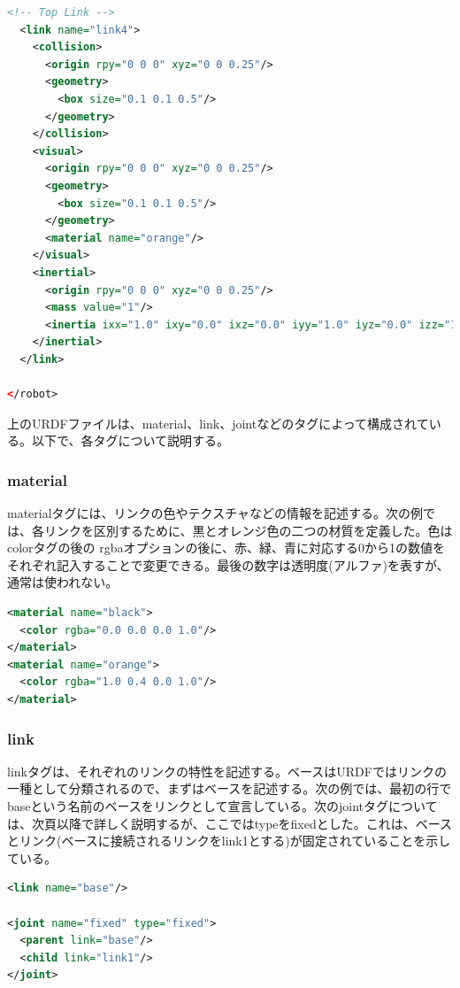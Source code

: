 \begin{lstlisting}[language=XML]
  <!-- Top Link -->
  <link name="link4">
    <collision>
      <origin rpy="0 0 0" xyz="0 0 0.25"/>
      <geometry>
        <box size="0.1 0.1 0.5"/>
      </geometry>
    </collision>
    <visual>
      <origin rpy="0 0 0" xyz="0 0 0.25"/>
      <geometry>
        <box size="0.1 0.1 0.5"/>
      </geometry>
      <material name="orange"/>
    </visual>
    <inertial>
      <origin rpy="0 0 0" xyz="0 0 0.25"/>
      <mass value="1"/>
      <inertia ixx="1.0" ixy="0.0" ixz="0.0" iyy="1.0" iyz="0.0" izz="1.0"/>
    </inertial>
  </link>

</robot>
\end{lstlisting}

上のURDFファイルは、material、link、jointなどのタグによって構成されている。以下で、各タグについて説明する。

\subsubsection{material}

materialタグには、リンクの色やテクスチャなどの情報を記述する。次の例では、各リンクを区別するために、黒とオレンジ色の二つの材質を定義した。色はcolorタグの後の rgbaオプションの後に、赤、緑、青に対応する0から1の数値をそれぞれ記入することで変更できる。最後の数字は透明度(アルファ)を表すが、通常は使われない。

\begin{lstlisting}[language=XML]
<material name="black">
  <color rgba="0.0 0.0 0.0 1.0"/>
</material>
<material name="orange">
  <color rgba="1.0 0.4 0.0 1.0"/>
</material>
\end{lstlisting}

\subsubsection{link}

linkタグは、それぞれのリンクの特性を記述する。ベースはURDFではリンクの一種として分類されるので、まずはベースを記述する。次の例では、最初の行でbaseという名前のベースをリンクとして宣言している。次のjointタグについては、次頁以降で詳しく説明するが、ここではtypeをfixedとした。これは、ベースとリンク(ベースに接続されるリンクをlink1とする)が固定されていることを示している。

\begin{lstlisting}[language=XML]
<link name="base"/>

<joint name="fixed" type="fixed">
  <parent link="base"/>
  <child link="link1"/>
</joint>
\end{lstlisting}

